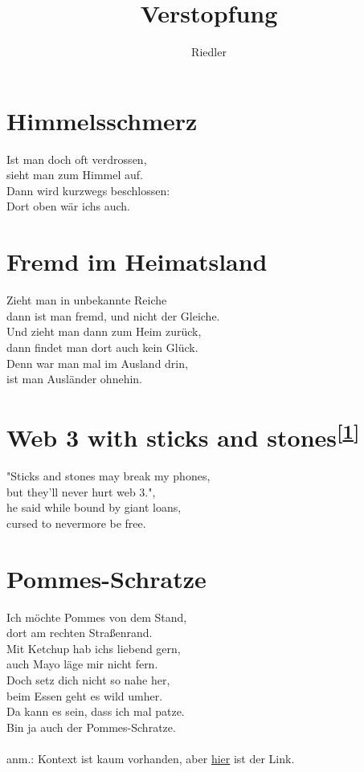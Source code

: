 \documentclass[11pt]{article}
\title{\textbf{Verstopfung}}
\author{Riedler}
\date{}
\begin{document}
\maketitle
\thispagestyle{empty}

\section*{Himmelsschmerz}

Ist man doch oft verdrossen,\\
sieht man zum Himmel auf.\\
Dann wird kurzwegs beschlossen:\\
Dort oben wär ichs auch.

\section*{Fremd im Heimatsland}

Zieht man in unbekannte Reiche\\
dann ist man fremd, und nicht der Gleiche.\\
Und zieht man dann zum Heim zurück,\\
dann findet man dort auch kein Glück.\\
Denn war man mal im Ausland drin,\\
ist man Ausländer ohnehin.

\section*{Web 3 with sticks and stones\textsuperscript{[\href{https://mas.to/@Riedler/109154135549306406}{1}]}}
"Sticks and stones may break my phones,\\
but they'll never hurt web 3.",\\
he said while bound by giant loans,\\
cursed to nevermore be free.

\section*{Pommes-Schratze}

Ich möchte Pommes von dem Stand,\\
dort am rechten Straßenrand.\\
Mit Ketchup hab ichs liebend gern,\\
auch Mayo läge mir nicht fern.\\
Doch setz dich nicht so nahe her,\\
beim Essen geht es wild umher.\\
Da kann es sein, dass ich mal patze.\\
Bin ja auch der Pommes-Schratze.\\
\\
anm.: Kontext ist kaum vorhanden, aber \href{https://mas.to/@Riedler/108709490168652329}{hier} ist der Link.
\end{document}
